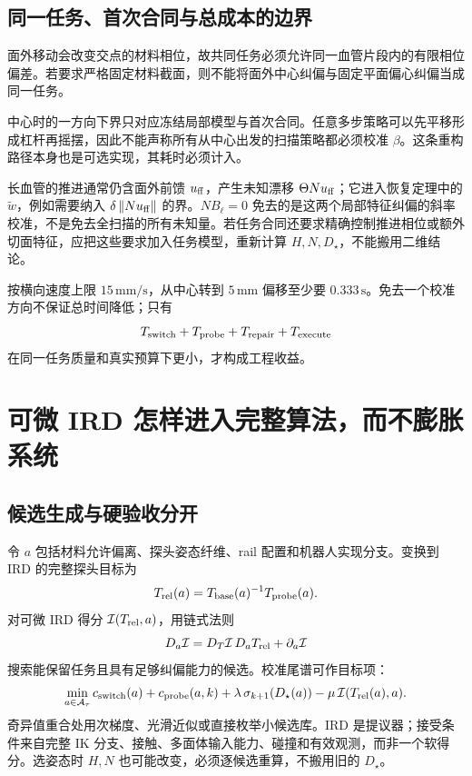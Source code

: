 \documentclass[11pt,a4paper]{article}
\numberwithin{equation}{section}
\theoremstyle{definition}
\newcommand{\norm}[1]{\left\lVert#1\right\rVert}
\begin{document}
\subsection{同一任务、首次合同与总成本的边界}
面外移动会改变交点的材料相位，故共同任务必须允许同一血管片段内的有限相位偏差。若要求严格固定材料截面，则不能将面外中心纠偏与固定平面偏心纠偏当成同一任务。

中心时的一方向下界只对应冻结局部模型与首次合同。任意多步策略可以先平移形成杠杆再摇摆，因此不能声称所有从中心出发的扫描策略都必须校准 $\beta$。这条重构路径本身也是可选实现，其耗时必须计入。

长血管的推进通常仍含面外前馈 $u_{\rm ff}$，产生未知漂移 $\Theta Nu_{\rm ff}$；它进入恢复定理中的 $\widetilde w$，例如需要纳入 $\delta\norm{Nu_{\rm ff}}$ 的界。$NB_\ell=0$ 免去的是这两个局部特征纠偏的斜率校准，不是免去全扫描的所有未知量。若任务合同还要求精确控制推进相位或额外切面特征，应把这些要求加入任务模型，重新计算 $H,N,D_\star$，不能搬用二维结论。

按横向速度上限 $15\,\mathrm{mm/s}$，从中心转到 $5\,\mathrm{mm}$ 偏移至少要 $0.333\,\mathrm{s}$。免去一个校准方向不保证总时间降低；只有
\begin{equation}
 T_{\rm switch}+T_{\rm probe}+T_{\rm repair}+T_{\rm execute}
\end{equation}
在同一任务质量和真实预算下更小，才构成工程收益。

\section{可微 IRD 怎样进入完整算法，而不膨胀系统}
\subsection{候选生成与硬验收分开}
令 $a$ 包括材料允许偏离、探头姿态纤维、rail 配置和机器人实现分支。变换到 IRD 的完整探头目标为
\begin{equation}
 T_{\rm rel}(a)=T_{\rm base}(a)^{-1}T_{\rm probe}(a).
\end{equation}
对可微 IRD 得分 $\mathcal I(T_{\rm rel},a)$，用链式法则
\begin{equation}
 D_a\mathcal I=D_T\mathcal I\,D_aT_{\rm rel}+\partial_a\mathcal I
\end{equation}
搜索能保留任务且具有足够纠偏能力的候选。校准尾谱可作目标项：
\begin{equation}
 \min_{a\in\mathcal A_\tau}
 c_{\rm switch}(a)+c_{\rm probe}(a,k)
 +\lambda\,\sigma_{k+1}(D_\star(a))
 -\mu\,\mathcal I(T_{\rm rel}(a),a).
\end{equation}
奇异值重合处用次梯度、光滑近似或直接枚举小候选库。IRD 是提议器；接受条件来自完整 IK 分支、接触、多面体输入能力、碰撞和有效观测，而非一个软得分。选姿态时 $H,N$ 也可能改变，必须逐候选重算，不搬用旧的 $D_\star$。
\end{document}
